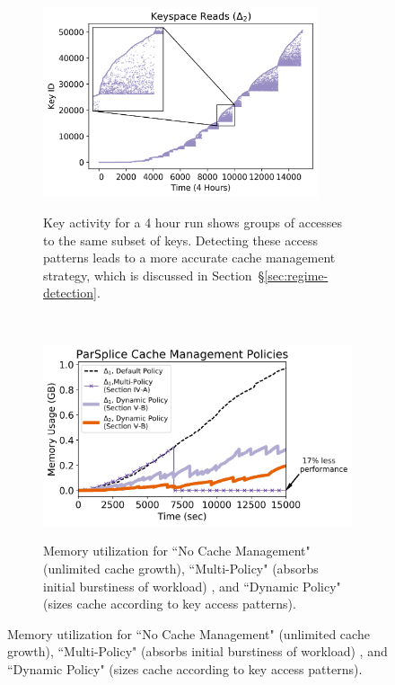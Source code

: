 \begin{figure}[t!]
    \begin{subfigure}[t]{0.32\textwidth}
        \centering
	\includegraphics[width=0.89\textwidth]{figures/keyspace-zoomed.png}\\
\caption{Key activity for a 4 hour run shows groups of accesses to the same
subset of keys. Detecting these access patterns leads to a more accurate cache
management strategy, which is discussed in
Section~\S\ref{sec:regime-detection}.\label{fig:keyspace-zoomed}}
    \end{subfigure}%
    ~ 
    \begin{subfigure}[t]{0.32\textwidth}
        \centering
        \includegraphics[width=1\textwidth]{figures/memory-vs-time.png}\\
	\caption{Memory utilization for ``No Cache Management" (unlimited cache
growth), ``Multi-Policy" (absorbs initial burstiness of workload) , and
``Dynamic Policy" (sizes cache according to key access patterns).
\label{fig:memory-vs-time}}
    \end{subfigure}%

\end{figure}
